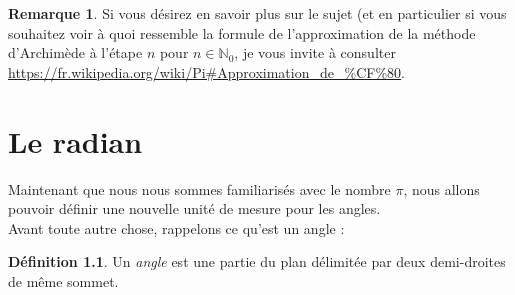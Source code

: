 \documentclass[a4paper,fontsize=13pt]{scrreprt}
\theoremstyle{plain}
\theoremstyle{definition}
\newtheorem{déf}[subsection]{Définition}
\newtheorem{rema}[subsection]{Remarque}
\newcommand{\nno}{\mathbb{N}_{0}}
\begin{document}
\begin{rema}
Si vous désirez en savoir plus sur le sujet (et en particulier si vous souhaitez voir à quoi ressemble la formule de l'approximation de la méthode d'Archimède à l'étape $n$ pour $n \in \nno$, je vous invite à consulter \href{https://fr.wikipedia.org/wiki/Pi\#Approximation\_de\_\%CF\%80}{https://fr.wikipedia.org/wiki/Pi\#Approximation\_de\_\%CF\%80}.
\end{rema}


\chapter{Le radian}

Maintenant que nous nous sommes familiarisés avec le nombre $\pi$, nous allons pouvoir définir une nouvelle unité de mesure pour les angles. \\
Avant toute autre chose, rappelons ce qu'est un angle :
\begin{déf}
Un \emph{angle} est une partie du plan délimitée par deux demi-droites de même sommet.
\end{déf}
\end{document}
